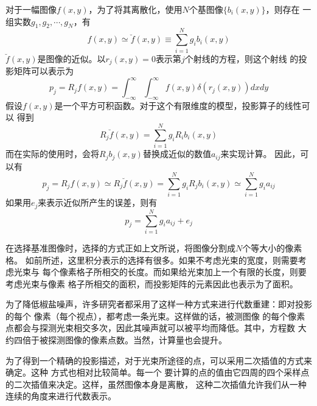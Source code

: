 对于一幅图像$f(x,y)$，为了将其离散化，使用$N$个基图像$\{b_i(x,y)\}$，则存在
一组实数$g_1,g_2,\cdots,g_N$，有
\begin{equation}
f(x,y)\simeq\breve{f}(x,y)\equiv\sum^N_{i=1}g_ib_i(x,y)
\end{equation}
$\breve{f}(x,y)$是图像的近似。以$r_j(x,y)=0$表示第$j$个射线的方程，则这个射线
的投影矩阵可以表示为
\begin{equation}
p_j=R_jf(x,y)=\int^\infty_{-\infty}\int^\infty_{-\infty}f(x,y)\delta(r_j(x,y))dxdy
\end{equation}
假设$f(x,y)$是一个平方可积函数。对于这个有限维度的模型，投影算子的线性可以
得到
\begin{equation}
R_j\breve{f}(x,y)=\sum^N_{i=1}g_iR_ib_i(x,y)
\end{equation}
而在实际的使用时，会将$R_jb_j(x,y)$替换成近似的数值$a_{ij}$来实现计算。
因此，可以有
\begin{equation}
p_j=R_jf(x,y)\simeq R_j\breve{f}(x,y)=\sum^N_{i=1}g_iR_jb_i(x,y)\simeq\sum^N_{i=1}g_ia_{ij}
\end{equation}
如果用$e_j$来表示近似所产生的误差，则有
\begin{equation*}
p_j=\sum^N_{i=1}g_ia_{ij}+e_j
\end{equation*}

在选择基准图像时，选择的方式正如上文所说，将图像分割成$N$个等大小的像素格。
如前所述，这里积分表示的选择有很多。如果不考虑光束的宽度，则需要考虑光束与
每个像素格子所相交的长度。而如果给光束加上一个有限的长度，则要考虑光束与像素
格子所相交的面积，而投影矩阵的元素因此也表示为了面积。

为了降低椒盐噪声，许多研究者都采用了这样一种方式来进行代数重建：即对投影的每个
像素（每个视点），都考虑一条光束\cite{smith1977practical}。这样做的话，被测图像
的每个像素点都会与探测光束相交多次，因此其噪声就可以被平均而降低。其中，方程数
大约四倍于被探测图像的像素点数\cite{herman2009fundamentals}。当然，计算量也会提升。

为了得到一个精确的投影描述，对于光束所途径的点，可以采用二次插值的方式来确定。这种
方式也相对比较简单\cite{herman1976iterative}\cite{andersen1982digital}。每一个
要计算的点的值由它四周的四个采样点的二次插值来决定。这样，虽然图像本身是离散，
这种二次插值允许我们从一种连续的角度来进行代数表示。

